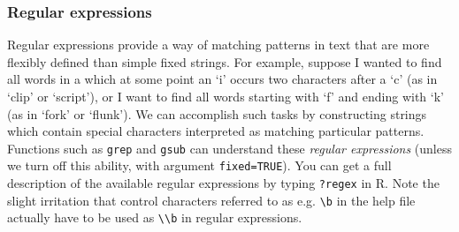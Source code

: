 \documentclass[10pt] {article}
\theoremstyle{definition}
\begin{document}
\subsubsection{Regular expressions}

Regular expressions provide a way of matching patterns in text that are more flexibly defined than simple fixed strings. For example, suppose I wanted to find all words in a which at some point an `i' occurs two characters after a `c' (as in `clip' or `script'), or I want to find all words starting with `f' and ending with `k' (as in `fork' or `flunk'). We can accomplish such tasks by constructing strings which contain special characters interpreted as matching particular patterns. Functions such as {\tt grep} and {\tt gsub} can understand these {\em regular expressions} (unless we turn off this ability, with argument \lstinline+fixed=TRUE+). You can get a full description of the available regular expressions by typing \lstinline+?regex+ in R.  Note the slight irritation that control characters referred to as e.g. \verb+\b+ in the help file actually have to be used as \verb+\\b+ in regular expressions.
\end{document}
